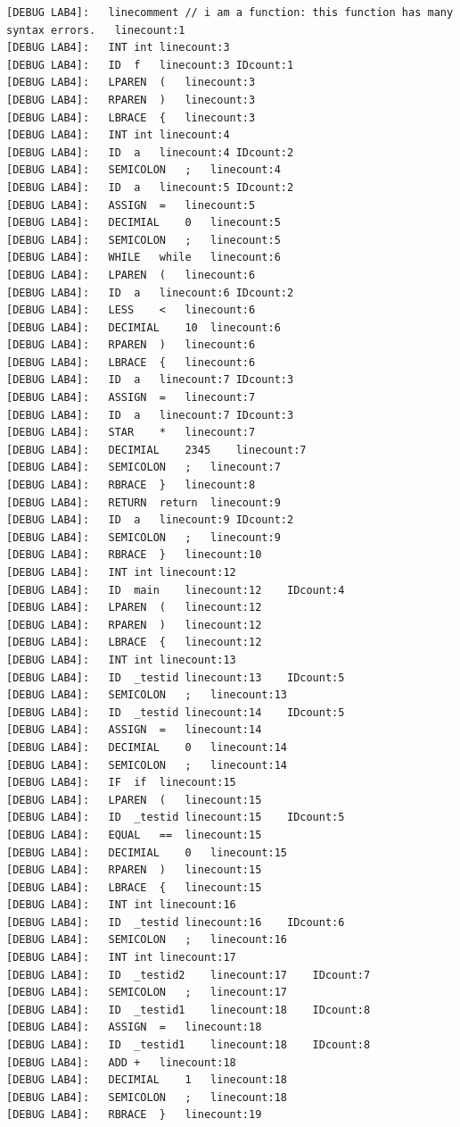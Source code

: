 \documentclass[UTF8,a4paper,10pt]{ctexart}
\begin{document}
\begin{lstlisting}[title = 词法分析结果]
[DEBUG LAB4]: 	linecomment	// i am a function: this function has many syntax errors.	linecount:1
[DEBUG LAB4]: 	INT	int	linecount:3
[DEBUG LAB4]: 	ID	f	linecount:3	IDcount:1
[DEBUG LAB4]: 	LPAREN	(	linecount:3
[DEBUG LAB4]: 	RPAREN	)	linecount:3
[DEBUG LAB4]: 	LBRACE	{	linecount:3
[DEBUG LAB4]: 	INT	int	linecount:4
[DEBUG LAB4]: 	ID	a	linecount:4	IDcount:2
[DEBUG LAB4]: 	SEMICOLON	;	linecount:4
[DEBUG LAB4]: 	ID	a	linecount:5	IDcount:2
[DEBUG LAB4]: 	ASSIGN	=	linecount:5
[DEBUG LAB4]: 	DECIMIAL	0	linecount:5
[DEBUG LAB4]: 	SEMICOLON	;	linecount:5
[DEBUG LAB4]: 	WHILE	while	linecount:6
[DEBUG LAB4]: 	LPAREN	(	linecount:6
[DEBUG LAB4]: 	ID	a	linecount:6	IDcount:2
[DEBUG LAB4]: 	LESS	<	linecount:6
[DEBUG LAB4]: 	DECIMIAL	10	linecount:6
[DEBUG LAB4]: 	RPAREN	)	linecount:6
[DEBUG LAB4]: 	LBRACE	{	linecount:6
[DEBUG LAB4]: 	ID	a	linecount:7	IDcount:3
[DEBUG LAB4]: 	ASSIGN	=	linecount:7
[DEBUG LAB4]: 	ID	a	linecount:7	IDcount:3
[DEBUG LAB4]: 	STAR	*	linecount:7
[DEBUG LAB4]: 	DECIMIAL	2345	linecount:7
[DEBUG LAB4]: 	SEMICOLON	;	linecount:7
[DEBUG LAB4]: 	RBRACE	}	linecount:8
[DEBUG LAB4]: 	RETURN	return	linecount:9
[DEBUG LAB4]: 	ID	a	linecount:9	IDcount:2
[DEBUG LAB4]: 	SEMICOLON	;	linecount:9
[DEBUG LAB4]: 	RBRACE	}	linecount:10
[DEBUG LAB4]: 	INT	int	linecount:12
[DEBUG LAB4]: 	ID	main	linecount:12	IDcount:4
[DEBUG LAB4]: 	LPAREN	(	linecount:12
[DEBUG LAB4]: 	RPAREN	)	linecount:12
[DEBUG LAB4]: 	LBRACE	{	linecount:12
[DEBUG LAB4]: 	INT	int	linecount:13
[DEBUG LAB4]: 	ID	_testid	linecount:13	IDcount:5
[DEBUG LAB4]: 	SEMICOLON	;	linecount:13
[DEBUG LAB4]: 	ID	_testid	linecount:14	IDcount:5
[DEBUG LAB4]: 	ASSIGN	=	linecount:14
[DEBUG LAB4]: 	DECIMIAL	0	linecount:14
[DEBUG LAB4]: 	SEMICOLON	;	linecount:14
[DEBUG LAB4]: 	IF	if	linecount:15
[DEBUG LAB4]: 	LPAREN	(	linecount:15
[DEBUG LAB4]: 	ID	_testid	linecount:15	IDcount:5
[DEBUG LAB4]: 	EQUAL	==	linecount:15
[DEBUG LAB4]: 	DECIMIAL	0	linecount:15
[DEBUG LAB4]: 	RPAREN	)	linecount:15
[DEBUG LAB4]: 	LBRACE	{	linecount:15
[DEBUG LAB4]: 	INT	int	linecount:16
[DEBUG LAB4]: 	ID	_testid	linecount:16	IDcount:6
[DEBUG LAB4]: 	SEMICOLON	;	linecount:16
[DEBUG LAB4]: 	INT	int	linecount:17
[DEBUG LAB4]: 	ID	_testid2	linecount:17	IDcount:7
[DEBUG LAB4]: 	SEMICOLON	;	linecount:17
[DEBUG LAB4]: 	ID	_testid1	linecount:18	IDcount:8
[DEBUG LAB4]: 	ASSIGN	=	linecount:18
[DEBUG LAB4]: 	ID	_testid1	linecount:18	IDcount:8
[DEBUG LAB4]: 	ADD	+	linecount:18
[DEBUG LAB4]: 	DECIMIAL	1	linecount:18
[DEBUG LAB4]: 	SEMICOLON	;	linecount:18
[DEBUG LAB4]: 	RBRACE	}	linecount:19

\end{lstlisting}
\end{document}
